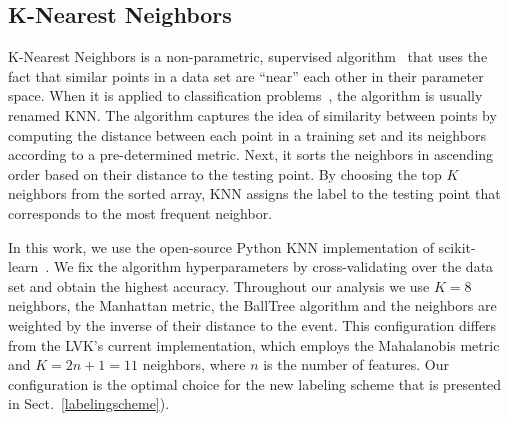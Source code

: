 \subsection*{K-Nearest Neighbors}

K-Nearest Neighbors is a non-parametric, supervised algorithm~\cite{Fix:1951,Cover:1967} that uses the fact that similar points in a data set are ``near'' each other in their parameter
space. When it is applied to classification problems~\cite{Guo:2004}, the algorithm is usually renamed \ac{KNN}. The algorithm captures the idea of similarity between points by computing
the distance between each point in a training set and its neighbors according to a pre-determined metric. Next, it sorts the neighbors in ascending order based on their distance to the
testing point. By choosing the top $K$ neighbors from the sorted array, \ac{KNN} assigns the label to the testing point that corresponds to the most frequent neighbor.

In this work, we use the open-source Python \ac{KNN} implementation of scikit-learn~\cite{Pedregosa:2011ork}. We fix the algorithm hyperparameters by cross-validating over the data set
and obtain the highest accuracy. Throughout our analysis we use $K = 8$ neighbors, the Manhattan metric, the BallTree algorithm and the neighbors are weighted by the inverse of their
distance to the event.  This configuration differs from the \ac{LVK}'s current implementation, which employs the Mahalanobis metric and $K = 2n + 1 = 11$ neighbors, where $n$ is the number
of features. Our configuration is the optimal choice for the new labeling scheme that is presented in Sect.~\ref{labelingscheme}).


